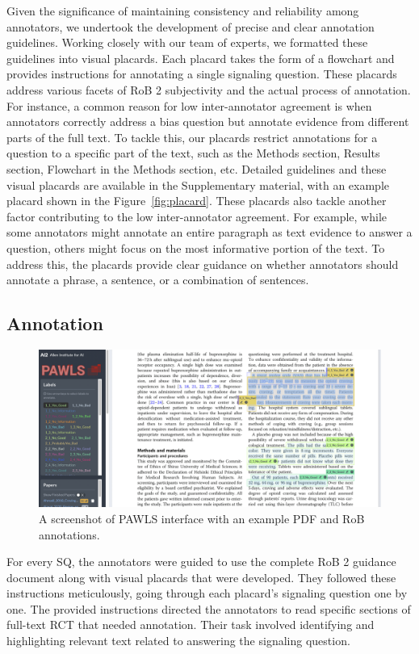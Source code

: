 \documentclass[sn-mathphys,Numbered]{sn-jnl}%
\theoremstyle{thmstyleone}%
\theoremstyle{thmstyletwo}%
\theoremstyle{thmstylethree}%
\begin{document}
Given the significance of maintaining consistency and reliability among annotators, we undertook the development of precise and clear annotation guidelines.
Working closely with our team of experts, we formatted these guidelines into visual placards.
Each placard takes the form of a flowchart and provides instructions for annotating a single signaling question.
These placards address various facets of RoB 2 subjectivity and the actual process of annotation.
For instance, a common reason for low inter-annotator agreement is when annotators correctly address a bias question but annotate evidence from different parts of the full text. 
To tackle this, our placards restrict annotations for a question to a specific part of the text, such as the Methods section, Results section, Flowchart in the Methods section, etc.
Detailed guidelines and these visual placards are available in the Supplementary material, with an example placard shown in the Figure~\ref{fig:placard}.
These placards also tackle another factor contributing to the low inter-annotator agreement.
For example, while some annotators might annotate an entire paragraph as text evidence to answer a question, others might focus on the most informative portion of the text.
To address this, the placards provide clear guidance on whether annotators should annotate a phrase, a sentence, or a combination of sentences.
%
%
%
\subsection{Annotation}
\label{annotation}
%
%
%
%
\begin{figure}[htb]
    \centering
    \includegraphics[width=0.80\columnwidth]{figures/pawls_layout.png}
    \caption{A screenshot of PAWLS interface with an example PDF and RoB annotations.}
    \label{fig:pawls}
\end{figure}
%
%
%
For every SQ, the annotators were guided to use the complete RoB 2 guidance document along with visual placards that were developed.
They followed these instructions meticulously, going through each placard's signaling question one by one.
The provided instructions directed the annotators to read specific sections of full-text RCT that needed annotation.
Their task involved identifying and highlighting relevant text related to answering the signaling question.
\end{document}
